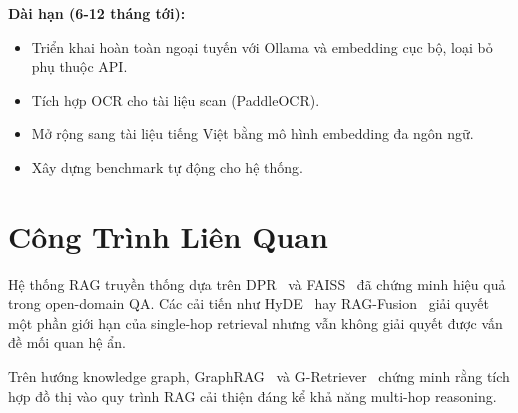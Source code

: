 \documentclass[10pt, conference, a4paper]{IEEEtran}
\begin{document}
\textbf{Dài hạn (6-12 tháng tới):}
\begin{itemize}
  \item Triển khai hoàn toàn ngoại tuyến với Ollama và embedding cục bộ,
    loại bỏ phụ thuộc API.
  \item Tích hợp OCR cho tài liệu scan (PaddleOCR).
  \item Mở rộng sang tài liệu tiếng Việt bằng mô hình embedding đa ngôn ngữ.
  \item Xây dựng benchmark tự động cho hệ thống.
\end{itemize}

\section{Công Trình Liên Quan}

Hệ thống RAG truyền thống dựa trên DPR~\cite{karpukhin2020dpr} và
FAISS~\cite{johnson2021faiss} đã chứng minh hiệu quả trong open-domain
QA. Các cải tiến như HyDE~\cite{gao2022hyde} hay RAG-Fusion~\cite{rackauckas2023ragfusion}
giải quyết một phần giới hạn của single-hop retrieval nhưng vẫn không
giải quyết được vấn đề mối quan hệ ẩn.

Trên hướng knowledge graph, GraphRAG~\cite{edge2024graphrag} và
G-Retriever~\cite{he2024gretriever} chứng minh rằng tích hợp đồ thị
vào quy trình RAG cải thiện đáng kể khả năng multi-hop reasoning.
\end{document}
